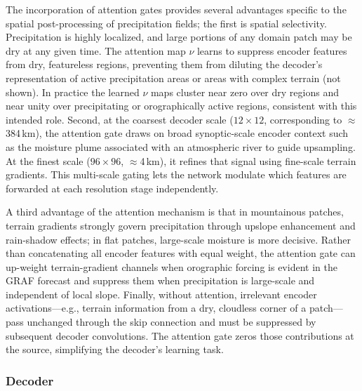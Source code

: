 \documentclass[11pt]{article}
\begin{document}
The incorporation of attention gates provides several advantages specific to the spatial
post-processing of precipitation fields; the first is spatial selectivity.
Precipitation is highly localized, and large portions of any domain
patch may be dry at any given time.  The attention map $\nu$ learns to
suppress encoder features from dry, featureless regions,
preventing them from diluting the decoder's representation
of active precipitation areas or areas with complex terrain (not shown).  
In practice the learned $\nu$ maps cluster near zero over dry regions and near
unity over precipitating or orographically active regions,
consistent with this intended role.  Second, at the coarsest decoder
scale ($12\times12$, corresponding to $\approx$384\,km),
the attention gate draws on broad synoptic-scale encoder
context such as the moisture plume associated with an
atmospheric river to guide upsampling.  At the finest
scale ($96\times96$, $\approx$4\,km), it refines that
signal using fine-scale terrain gradients.  This multi-scale
gating lets the network modulate which features are
forwarded at each resolution stage independently.

A third advantage of the attention mechanism is that in
mountainous patches, terrain gradients strongly govern precipitation through
upslope enhancement and rain-shadow effects; in flat
patches, large-scale moisture is more decisive.  Rather
than concatenating all encoder features with equal weight,
the attention gate can up-weight terrain-gradient channels
when orographic forcing is evident in the GRAF forecast
and suppress them when precipitation is large-scale and
independent of local slope.  Finally, without attention,
irrelevant encoder activations---e.g., terrain information
from a dry, cloudless corner of a patch---pass unchanged
through the skip connection and must be suppressed by
subsequent decoder convolutions.  The attention gate
zeros those contributions at the source, simplifying
the decoder's learning task.

\subsubsection{Decoder}
\label{sec:decoder}
\end{document}
